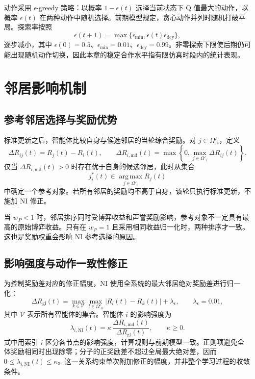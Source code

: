 动作采用 $\epsilon$-greedy 策略：以概率 $1-\epsilon(t)$ 选择当前状态下 Q 值最大的动作，以概率 $\epsilon(t)$ 在两种动作中随机选择。前期模型规定，贪心动作并列时随机打破平局。探索率按照
\begin{equation}
 \epsilon(t+1)=\max\{\epsilon_{\min},\epsilon(t)\epsilon_{\mathrm{dcy}}\},
 \label{eq:w1-epsilon}
\end{equation}
逐步减小，其中 $\epsilon(0)=0.5$、$\epsilon_{\min}=0.01$、$\epsilon_{\mathrm{dcy}}=0.99$。非零探索下限使后期仍可能出现随机动作切换，因此本章的稳定合作水平指有限仿真时段内的统计表现。

\section{邻居影响机制}
\subsection{参考邻居选择与奖励优势}

标准更新之后，智能体比较自身与候选邻居的当轮综合奖励。对 $j\in\Omega'_i$，定义
\begin{equation}
 \Delta R_{ij}(t)=R_j(t)-R_i(t),\qquad
 \Delta R_{i,\mathrm{md}}(t)=
 \max\left\{0,\max_{j\in\Omega'_i}\Delta R_{ij}(t)\right\}.
 \label{eq:w1-positive-gap}
\end{equation}
仅当 $\Delta R_{i,\mathrm{md}}(t)>0$ 时存在优于自身的候选邻居，此时从集合
\begin{equation}
 j_i^*(t)\in\operatorname*{arg\,max}_{j\in\Omega'_i}R_j(t)
 \label{eq:w1-best-neighbor}
\end{equation}
中确定一个参考对象。若所有邻居的奖励均不高于自身，该轮只执行标准更新，不施加 NI 修正。

当 $w_P<1$ 时，邻居排序同时受博弈收益和声誉奖励影响，参考对象不一定具有最高的原始博弈收益。只有在 $w_P=1$ 且采用相同收益归一化时，两种排序才一致。这也是奖励权重会影响 NI 参考选择的原因。

\subsection{影响强度与动作一致性修正}

为控制奖励差对应的修正幅度，NI 使用全系统的最大邻居绝对奖励差进行归一化：
\begin{equation}
 \Delta R_{\mathrm{gl}}(t)=
 \max_{k\in\mathcal V}\max_{l\in\Omega'_k}|R_l(t)-R_k(t)|+\lambda_\epsilon,
 \qquad\lambda_\epsilon=0.01,
 \label{eq:w1-global-gap}
\end{equation}
其中 $\mathcal V$ 表示所有智能体的集合。智能体 $i$ 的影响强度为
\begin{equation}
 \lambda_{i,\mathrm{NI}}(t)=\kappa\,
       \frac{\Delta R_{i,\mathrm{md}}(t)}{\Delta R_{\mathrm{gl}}(t)},\qquad\kappa\geq0.
 \label{eq:w1-ni-strength}
\end{equation}
式中用索引 $i$ 区分各节点的影响强度，计算规则与前期模型一致。正则项避免全体奖励相同时出现除零；分子的正奖励差不超过全局最大绝对差，因而 $0\leq\lambda_{i,\mathrm{NI}}(t)\leq\kappa$。这一关系约束单次附加修正的幅度，并非整个学习过程的收敛条件。

